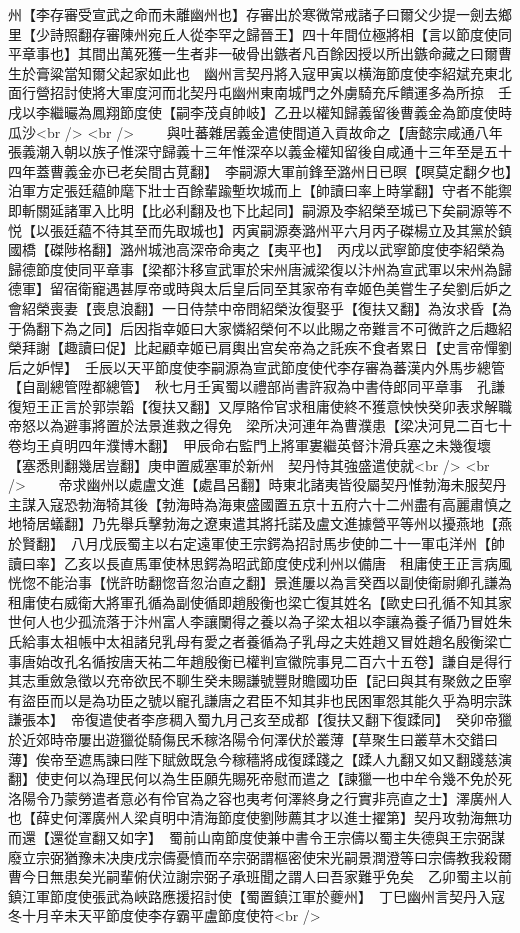 州【李存審受宣武之命而未離幽州也】存審出於寒微常戒諸子曰爾父少提一劍去鄉里【少詩照翻存審陳州宛丘人從李罕之歸晉王】四十年間位極將相【言以節度使同平章事也】其間出萬死獲一生者非一破骨出鏃者凡百餘因授以所出鏃命藏之曰爾曹生於膏粱當知爾父起家如此也　幽州言契丹將入寇甲寅以横海節度使李紹斌充東北面行營招討使將大軍度河而北契丹屯幽州東南城門之外虜騎充斥饋運多為所掠　壬戌以李繼曮為鳳翔節度使【嗣李茂貞帥岐】乙丑以權知歸義留後曹義金為節度使時瓜沙<br />
<br />
　　與吐蕃雜居義金遣使間道入貢故命之【唐懿宗咸通八年張義潮入朝以族子惟深守歸義十三年惟深卒以義金權知留後自咸通十三年至是五十四年蓋曹義金亦已老矣間古莧翻】　李嗣源大軍前鋒至潞州日已暝【暝莫定翻夕也】泊軍方定張廷藴帥麾下壯士百餘輩踰塹坎城而上【帥讀曰率上時掌翻】守者不能禦即斬關延諸軍入比明【比必利翻及也下比起同】嗣源及李紹榮至城已下矣嗣源等不悦【以張廷藴不待其至而先取城也】丙寅嗣源奏潞州平六月丙子磔楊立及其黨於鎮國橋【磔陟格翻】潞州城池高深帝命夷之【夷平也】　丙戌以武寧節度使李紹榮為歸德節度使同平章事【梁都汴移宣武軍於宋州唐滅梁復以汴州為宣武軍以宋州為歸德軍】留宿衛寵遇甚厚帝或時與太后皇后同至其家帝有幸姬色美嘗生子矣劉后妒之會紹榮喪妻【喪息浪翻】一日侍禁中帝問紹榮汝復娶乎【復扶又翻】為汝求昏【為于偽翻下為之同】后因指幸姬曰大家憐紹榮何不以此賜之帝難言不可微許之后趣紹榮拜謝【趣讀曰促】比起顧幸姬已肩輿出宫矣帝為之託疾不食者累日【史言帝憚劉后之妒悍】　壬辰以天平節度使李嗣源為宣武節度使代李存審為蕃漢内外馬步總管【自副總管陞都總管】　秋七月壬寅蜀以禮部尚書許寂為中書侍郎同平章事　孔謙復短王正言於郭崇韜【復扶又翻】又厚賂伶官求租庸使終不獲意怏怏癸卯表求解職帝怒以為避事將置於法景進救之得免　梁所决河連年為曹濮患【梁决河見二百七十卷均王貞明四年濮博木翻】　甲辰命右監門上將軍婁繼英督汴滑兵塞之未幾復壞【塞悉則翻幾居豈翻】庚申置威塞軍於新州　契丹恃其強盛遣使就<br />
<br />
　　帝求幽州以處盧文進【處昌呂翻】時東北諸夷皆役屬契丹惟勃海未服契丹主謀入寇恐勃海犄其後【勃海時為海東盛國置五京十五府六十二州盡有高麗肅慎之地犄居蟻翻】乃先舉兵擊勃海之遼東遣其將托諾及盧文進據營平等州以擾燕地【燕於賢翻】　八月戊辰蜀主以右定遠軍使王宗鍔為招討馬步使帥二十一軍屯洋州【帥讀曰率】乙亥以長直馬軍使林思鍔為昭武節度使戍利州以備唐　租庸使王正言病風恍惚不能治事【恍許昉翻惚音忽治直之翻】景進屢以為言癸酉以副使衛尉卿孔謙為租庸使右威衛大將軍孔循為副使循即趙殷衡也梁亡復其姓名【歐史曰孔循不知其家世何人也少孤流落于汴州富人李讓闌得之養以為子梁太祖以李讓為養子循乃冒姓朱氏給事太祖帳中太祖諸兒乳母有愛之者養循為子乳母之夫姓趙又冒姓趙名殷衡梁亡事唐始改孔名循按唐天祐二年趙殷衡已權判宣徽院事見二百六十五卷】謙自是得行其志重斂急徵以充帝欲民不聊生癸未賜謙號豐財贍國功臣【記曰與其有聚斂之臣寧有盜臣而以是為功臣之號以寵孔謙唐之君臣不知其非也民困軍怨其能久乎為明宗誅謙張本】　帝復遣使者李彦稠入蜀九月己亥至成都【復扶又翻下復蹂同】　癸卯帝獵於近郊時帝屢出遊獵從騎傷民禾稼洛陽令何澤伏於叢薄【草聚生曰叢草木交錯曰薄】俟帝至遮馬諫曰陛下賦斂既急今稼穡將成復蹂踐之【蹂人九翻又如又翻踐慈演翻】使吏何以為理民何以為生臣願先賜死帝慰而遣之【諫獵一也中牟令幾不免於死洛陽令乃蒙勞遣者意必有伶官為之容也夷考何澤終身之行實非亮直之士】澤廣州人也【薛史何澤廣州人梁貞明中清海節度使劉陟薦其才以進士擢第】契丹攻勃海無功而還【還從宣翻又如字】　蜀前山南節度使兼中書令王宗儔以蜀主失德與王宗弼謀廢立宗弼猶豫未决庚戌宗儔憂憤而卒宗弼謂樞密使宋光嗣景潤澄等曰宗儔教我殺爾曹今日無患矣光嗣輩俯伏泣謝宗弼子承班聞之謂人曰吾家難乎免矣　乙卯蜀主以前鎮江軍節度使張武為峽路應援招討使【蜀置鎮江軍於夔州】　丁巳幽州言契丹入寇冬十月辛未天平節度使李存霸平盧節度使符<br />
